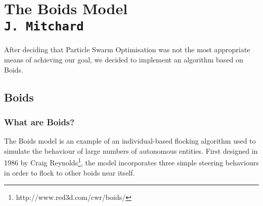 \pagestyle{empty}

\section{The Boids Model\\{\small\tt J.~Mitchard}}
After deciding that Particle Swarm Optimisation was not the most appropriate means of achieving our goal, we decided to implement an algorithm based on Boids.

\subsection{Boids}
\subsubsection{What are Boids?}
The Boids model is an example of an individual-based flocking algorithm used to simulate the behaviour of large numbers of autonomous entities. First designed in 1986 by Craig Reynolds\footnote{http://www.red3d.com/cwr/boids/}, the model incorporates three simple steering behaviours in order to flock to other boids near itself.

